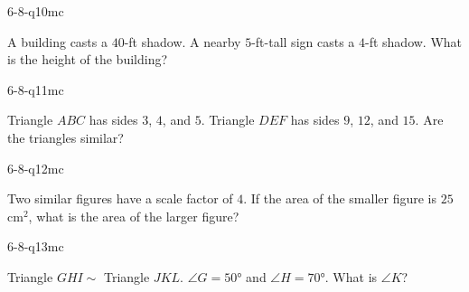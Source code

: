 \begin{practiceQuestion}{6-8-q10}{mc}
\begin{questionText}
A building casts a $40$-ft shadow. A nearby $5$-ft-tall sign casts a $4$-ft shadow. What is the height of the building?
\end{questionText}
\end{practiceQuestion}

\begin{practiceQuestion}{6-8-q11}{mc}
\begin{questionText}
Triangle $ABC$ has sides $3$, $4$, and $5$. Triangle $DEF$ has sides $9$, $12$, and $15$. Are the triangles similar?
\end{questionText}
\end{practiceQuestion}

\begin{practiceQuestion}{6-8-q12}{mc}
\begin{questionText}
Two similar figures have a scale factor of $4$. If the area of the smaller figure is $25$ cm$^2$, what is the area of the larger figure?
\end{questionText}
\end{practiceQuestion}

\begin{practiceQuestion}{6-8-q13}{mc}
\begin{questionText}
Triangle $GHI \sim$ Triangle $JKL$. $\angle G = 50°$ and $\angle H = 70°$. What is $\angle K$?
\end{questionText}
\end{practiceQuestion}

